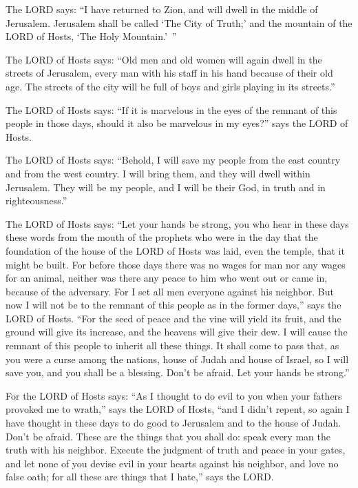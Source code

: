 \myverse{}The LORD says: “I have returned to Zion, and will dwell in the
middle of Jerusalem. Jerusalem shall be called ‘The City of Truth;’ and the mountain of the LORD of Hosts,
‘The Holy Mountain.’ ”

\myverse{}The LORD of Hosts says: “Old men and old women will again dwell
in the streets of Jerusalem, every man with his staff in his hand because of their old age.
\myverse{}The streets of the city will be full of boys and girls playing in its streets.”

\myverse{}The LORD of Hosts says: “If it is marvelous in the eyes of the
remnant of this people in those days, should it also be marvelous in my eyes?” says the LORD of Hosts.

\myverse{}The LORD of Hosts says: “Behold, I will save my people from the
east country and from the west country.
\myverse{}I will bring them, and they will dwell within Jerusalem. They will be my people,
and I will be their God, in truth and in righteousness.”

\myverse{}The LORD of Hosts says: “Let your hands be strong, you who hear
in these days these words from the mouth of the prophets who were in the day that the foundation of the
house of the LORD of Hosts was laid, even the temple, that it might be built.
\myverse{}For before those days there was no wages for man nor any wages for an animal,
neither was there any peace to him who went out or came in, because of the adversary. For I set all men
everyone against his neighbor.
\myverse{}But now I will not be to the remnant of this people as in the former days,”
says the LORD of Hosts.
\myverse{}“For the seed of peace and the vine will yield its fruit, and the ground will
give its increase, and the heavens will give their dew. I will cause the remnant of this people to inherit
all these things.
\myverse{}It shall come to pass that, as you were a curse among the nations, house of
Judah and house of Israel, so I will save you, and you shall be a blessing. Don’t be afraid. Let your
hands be strong.”

\myverse{}For the LORD of Hosts says: “As I thought to do evil to you when
your fathers provoked me to wrath,” says the LORD of Hosts, “and I didn’t repent,
\myverse{}so again I have thought in these days to do good to Jerusalem and to the house
of Judah. Don’t be afraid.
\myverse{}These are the things that you shall do: speak every man the truth with his
neighbor. Execute the judgment of truth and peace in your gates,
\myverse{}and let none of you devise evil in your hearts against his neighbor, and love
no false oath; for all these are things that I hate,” says the LORD.

